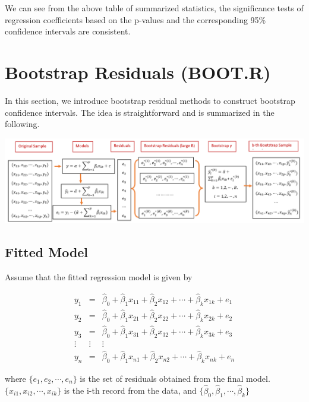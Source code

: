 \documentclass[
]{book}
\begin{document}
We can see from the above table of summarized statistics, the significance tests of regression coefficients based on the p-values and the corresponding 95\% confidence intervals are consistent.

\hypertarget{bootstrap-residuals-boot.r}{%
\section{Bootstrap Residuals (BOOT.R)}\label{bootstrap-residuals-boot.r}}

In this section, we introduce bootstrap residual methods to construct bootstrap confidence intervals. The idea is straightforward and is summarized in the following.

\begin{center}\includegraphics[width=1\linewidth]{img05/w05-BootsResiduals} \end{center}

\hypertarget{fitted-model}{%
\subsection{Fitted Model}\label{fitted-model}}

Assume that the fitted regression model is given by

\[
\begin{array}{ccc} 
y_1 & = &  \hat{\beta}_0 + \hat{\beta}_1 x_{11} + \hat{\beta}_2 x_{12} + \cdots + \hat{\beta}_k x_{1k} + e_1  \\
y_2 & = &  \hat{\beta}_0 + \hat{\beta}_1 x_{21} + \hat{\beta}_2 x_{22} + \cdots + \hat{\beta}_k x_{2k} + e_2  \\
y_3 & = &  \hat{\beta}_0 + \hat{\beta}_1 x_{31} + \hat{\beta}_2 x_{32} + \cdots + \hat{\beta}_k x_{3k} + e_3  \\
\vdots & \vdots & \vdots \\
y_n & = &  \hat{\beta}_0 + \hat{\beta}_1 x_{n1} + \hat{\beta}_2 x_{n2} + \cdots + \hat{\beta}_k x_{nk} + e_n
\end{array}
\]

where \(\{e_1, e_2, \cdots, e_n \}\) is the set of residuals obtained from the final model. \(\{x_{i1}, x_{i2}, \cdots, x_{ik} \}\) is the i-th record from the data, and \(\{ \hat{\beta}_0, \hat{\beta}_1, \cdots, \hat{\beta}_k \}\)
\end{document}
